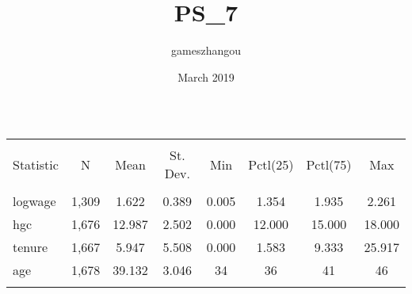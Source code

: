 \documentclass{article}
\title{PS_7}
\author{gameszhangou }
\date{March 2019}
\begin{document}
\begin{table}[!htbp] \centering 
  \caption{} 
  \label{} 
\begin{tabular}{@{\extracolsep{5pt}}lccccccc} 
\\[-1.8ex]\hline 
\hline \\[-1.8ex] 
Statistic & \multicolumn{1}{c}{N} & \multicolumn{1}{c}{Mean} & \multicolumn{1}{c}{St. Dev.} & \multicolumn{1}{c}{Min} & \multicolumn{1}{c}{Pctl(25)} & \multicolumn{1}{c}{Pctl(75)} & \multicolumn{1}{c}{Max} \\ 
\hline \\[-1.8ex] 
logwage & 1,309 & 1.622 & 0.389 & 0.005 & 1.354 & 1.935 & 2.261 \\ 
hgc & 1,676 & 12.987 & 2.502 & 0.000 & 12.000 & 15.000 & 18.000 \\ 
tenure & 1,667 & 5.947 & 5.508 & 0.000 & 1.583 & 9.333 & 25.917 \\ 
age & 1,678 & 39.132 & 3.046 & 34 & 36 & 41 & 46 \\ 
\hline \\[-1.8ex] 
\end{tabular} 
\end{table} 


\
\end{document}
